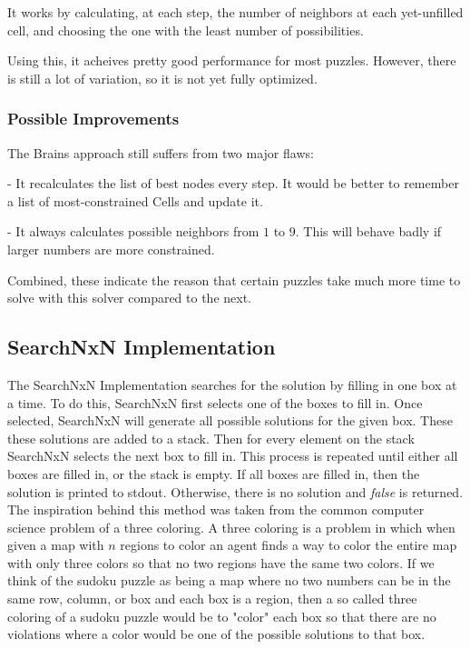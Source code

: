 \documentclass[letterpaper]{article}
\begin{document}
It works by calculating, at each step, the number of neighbors at each
yet-unfilled cell, and choosing the one with the least number of
possibilities.

Using this, it acheives pretty good performance for most puzzles. However,
there is still a lot of variation, so it is not yet fully optimized.

\subsubsection{Possible Improvements}
The Brains approach still suffers from two major flaws:

    - It recalculates the list of best nodes every step. It would be better
    to remember a list of most-constrained Cells and update it.

    - It always calculates possible neighbors from $ 1 $ to $ 9 $.
    This will behave badly if larger numbers are more constrained.

Combined, these indicate the reason that certain puzzles take much more
time to solve with this solver compared to the next.


\subsection{SearchNxN Implementation}

The SearchNxN Implementation searches for the solution by filling in one box at a time. To do this, SearchNxN first selects one of the boxes to fill in. Once selected, SearchNxN will generate all possible solutions for the given box. These these solutions are added to a stack. Then for every element on the stack SearchNxN selects the next box to fill in. This process is repeated until either all boxes are filled in, or the stack is empty. If all boxes are filled in, then the solution is printed to stdout. Otherwise, there is no solution and \emph{false} is returned. The inspiration behind this method was taken from the common computer science problem of a three coloring. A three coloring is a problem in which when given a map with $n$ regions to color an agent finds a way to color the entire map with only three colors so that no two regions have the same two colors. If we think of the sudoku puzzle as being a map where no two numbers can be in the same row, column, or box and each box is a region, then a so called three coloring of a sudoku puzzle would be to "color" each box so that there are no violations where a color would be one of the possible solutions to that box.
\end{document}
